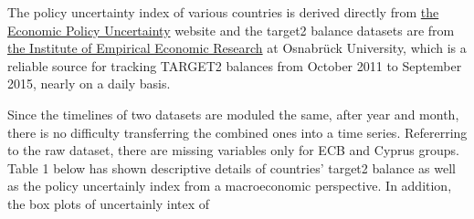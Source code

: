 \documentclass[12pt]{article}
\begin{document}
The policy uncertainty index of various countries is derived directly from \href{https://www.policyuncertainty.com/monetary.html}{the Economic Policy Uncertainty} website and the target2 balance datasets are from \href{http://www.eurocrisismonitor.com}{the Institute of Empirical Economic Research} at Osnabrück University, which is a reliable source for tracking TARGET2 balances from October 2011 to September 2015, nearly on a daily basis. 

Since the timelines of two datasets are moduled the same, after year and month, there is no difficulty transferring the combined ones into a time series. Refererring to the raw dataset, there are missing variables only for ECB and Cyprus groups. Table 1 below has shown descriptive details of countries' target2 balance as well as the policy uncertainly index from a macroeconomic perspective. In addition, the box plots of uncertainly intex of 
\end{document}
